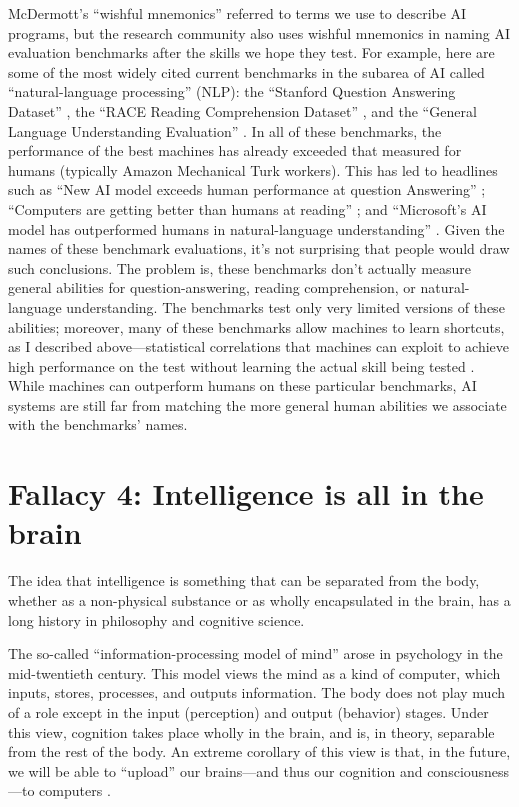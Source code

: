 \documentclass{article}
\begin{document}
McDermott's ``wishful mnemonics'' referred to terms we use to describe AI programs, but the research community also uses wishful mnemonics in naming AI evaluation benchmarks after the skills we hope they test.  For example, here are some of the most widely cited current benchmarks in the subarea of AI called ``natural-language processing'' (NLP):  the ``Stanford Question Answering Dataset'' \cite{SQUAD}, the ``RACE Reading Comprehension Dataset'' \cite{RACEDataset}, and the ``General Language Understanding Evaluation'' \cite{GLUEBenchmark}.   In all of these benchmarks, the performance of the best machines has already exceeded that measured for humans (typically Amazon Mechanical Turk workers).  This has led to headlines such as ``New AI model exceeds human performance at question Answering'' \cite{Costenaro2018}; ``Computers are getting better than humans at reading'' \cite{Pham2018};  and ``Microsoft's AI model has outperformed humans in natural-language understanding'' \cite{Jawad2021}. Given the names of these benchmark evaluations, it's not surprising that people would draw such conclusions.  The problem is, these benchmarks don't actually measure general abilities for question-answering, reading comprehension, or natural-language understanding. The benchmarks test only very limited versions of these abilities; moreover, many of these benchmarks allow machines to learn shortcuts, as I described above---statistical correlations that machines can exploit to achieve high performance on the test without learning the actual skill being tested \cite{McCoy2019,Linzen2020}. While machines can outperform humans on these particular benchmarks, AI systems are still far from matching the more general human abilities we associate with the benchmarks' names.  

\section*{Fallacy 4: Intelligence is all in the brain}

The idea that intelligence is something that can be separated from the body, whether as a non-physical substance or as wholly encapsulated in the brain, has a long history in philosophy and cognitive science. 

The so-called ``information-processing model of mind'' arose in psychology in the mid-twentieth century.  This model views the mind as a kind of computer, which inputs, stores, processes, and outputs information. The body does not play much of a role except in the input (perception) and output (behavior) stages.  Under this view, cognition takes place wholly in the brain, and is, in theory, separable from the rest of the body.  An extreme corollary of this view is that, in the future, we will be able to ``upload'' our brains---and thus our cognition and consciousness---to computers \cite{Woollaston2013}. 
\end{document}
